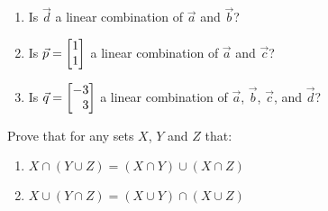 \begin{exercises}
\begin{problist}
\begin{enumerate}
			\item Is $\vec d$ a linear combination of $\vec a$ and $\vec b$?
			\item Is $\vec p=\mat{1\\1}$ a linear combination of $\vec a$ and $\vec c$?
			\item Is $\vec q=\mat{-3\\3}$ a linear combination of $\vec a$, $\vec b$, $\vec c$, and $\vec d$?
		\end{enumerate}
		\prob
			Prove that for any sets $X$, $Y$ and $Z$ that:
			\begin{enumerate}
				\item $X \cap (Y \cup Z) = (X\cap Y) \cup (X\cap Z)$
				\item $X \cup (Y \cap Z) = (X\cup Y) \cap (X\cup Z)$
			\end{enumerate}
	\end{problist}
\end{exercises}
